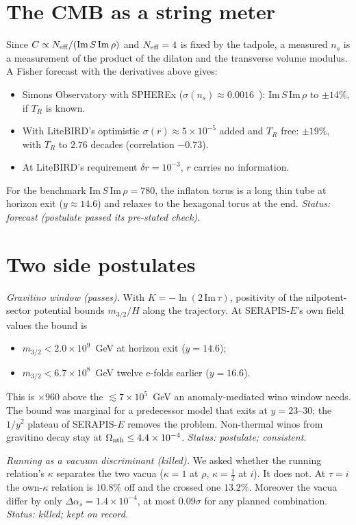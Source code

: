 \documentclass[aps,prd,twocolumn,superscriptaddress,nofootinbib,showkeys]{revtex4-2}
\begin{document}
\section{The CMB as a string meter}
Since $C\propto N_{\rm eff}/(\mathrm{Im}\,S\,\mathrm{Im}\,\rho)$ and $N_{\rm eff}=4$ is fixed by the tadpole, a measured $n_s$ is a measurement of the product of the dilaton and the transverse volume modulus. A Fisher forecast with the derivatives above gives:
\begin{itemize}
\item Simons Observatory with SPHEREx ($\sigma(n_s)\approx0.0016$~\cite{SOfc}): $\mathrm{Im}\,S\,\mathrm{Im}\,\rho$ to $\pm14\%$, if $T_R$ is known.
\item With LiteBIRD's optimistic $\sigma(r)\approx5\times10^{-5}$ added and $T_R$ free: $\pm19\%$, with $T_R$ to $2.76$ decades (correlation $-0.73$).
\item At LiteBIRD's requirement $\delta r=10^{-3}$, $r$ carries no information.
\end{itemize}
For the benchmark $\mathrm{Im}\,S\,\mathrm{Im}\,\rho=780$, the inflaton torus is a long thin tube at horizon exit ($y\approx14.6$) and relaxes to the hexagonal torus at the end. \emph{Status: forecast (postulate passed its pre-stated check).}

\section{Two side postulates}
\emph{Gravitino window (passes).} With $K=-\ln(2\,\mathrm{Im}\,\tau)$, positivity of the nilpotent-sector potential bounds $m_{3/2}/H$ along the trajectory. At SERAPIS-$E$'s own field values the bound is
\begin{itemize}
\item $m_{3/2}<2.0\times10^9$~GeV at horizon exit ($y=14.6$);
\item $m_{3/2}<6.7\times10^8$~GeV twelve e-folds earlier ($y=16.6$).
\end{itemize}
This is $\times960$ above the $\lesssim7\times10^5$~GeV an anomaly-mediated wino window needs. The bound was marginal for a predecessor model that exits at $y=23$--$30$; the $1/y^2$ plateau of SERAPIS-$E$ removes the problem. Non-thermal winos from gravitino decay stay at $\Omega_{\rm nth}\le4.4\times10^{-4}$. \emph{Status: postulate; consistent.}

\emph{Running as a vacuum discriminant (killed).} We asked whether the running relation's $\kappa$ separates the two vacua ($\kappa=1$ at $\rho$, $\kappa=\tfrac12$ at $i$). It does not. At $\tau=i$ the own-$\kappa$ relation is $10.8\%$ off and the crossed one $13.2\%$. Moreover the vacua differ by only $\Delta\alpha_s=1.4\times10^{-4}$, at most $0.09\sigma$ for any planned combination. \emph{Status: killed; kept on record.}
\end{document}
